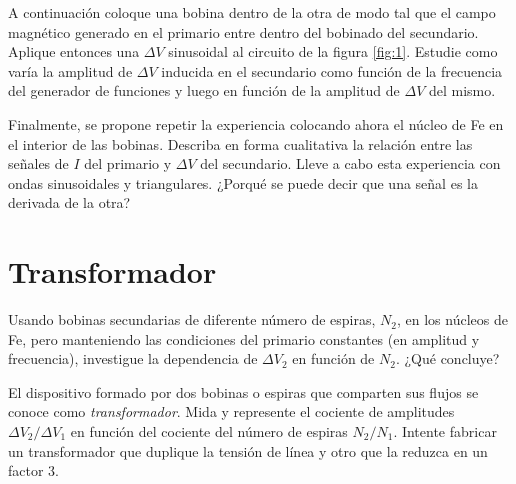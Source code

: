 \documentclass[laboratorio]{guia}
\begin{document}
A continuación coloque una bobina dentro de la otra de modo tal que el campo magnético generado en el primario entre dentro del bobinado del secundario.
Aplique entonces una \(\Delta V\) sinusoidal al circuito de la figura \ref{fig:1}.
Estudie como varía la amplitud de \(\Delta V\) inducida en el secundario como función de la frecuencia del generador de funciones y luego en función de la amplitud de \(\Delta V\) del mismo.

Finalmente, se propone repetir la experiencia colocando ahora el núcleo de Fe en el interior de las bobinas.
Describa en forma cualitativa la relación entre las señales de \(I\) del primario y \(\Delta V\) del secundario.
Lleve a cabo esta experiencia con ondas sinusoidales y triangulares.
¿Porqué se puede decir que una señal es la derivada de la otra?


\section{Transformador}
Usando bobinas secundarias de diferente número de espiras, $N_2$, en los núcleos de Fe, pero manteniendo las condiciones del primario constantes (en amplitud y frecuencia), investigue la dependencia de $\Delta V_2$ en función de $N_2$. ¿Qué concluye? 

El dispositivo formado por dos bobinas o espiras que comparten sus flujos se conoce como {\it transformador}.
Mida y represente el cociente de amplitudes $\Delta V_2/\Delta V_1$ en función del cociente del número de espiras $N_2/N_1$.
Intente fabricar un transformador que duplique la tensión de línea y otro que la reduzca en un factor 3. 


\nocite{Alonso1998,Purcell1988,Reitz1996,Trelles1984,Reitz1996}
 

\end{document}
